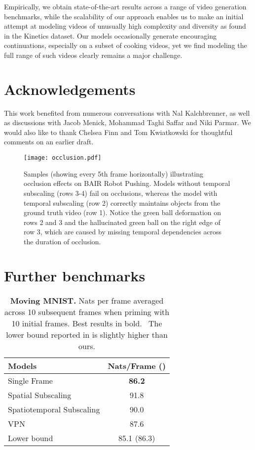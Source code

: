\documentclass{article} \usepackage{iclr2020_conference,times}
\begin{document}
Empirically, we obtain state-of-the-art results across a range of video generation benchmarks, while the scalability of our approach enables us to make an initial attempt at modeling videos of unusually high complexity and diversity as found in the Kinetics dataset. Our models occasionally generate encouraging continuations, especially on a subset of cooking videos, yet we find modeling the full range of such videos clearly remains a major challenge.

\section*{Acknowledgements}
This work benefited from numerous conversations with Nal Kalchbrenner, as well as discussions
with Jacob Menick, Mohammad Taghi Saffar and Niki Parmar. We would also like to thank Chelsea
Finn and Tom Kwiatkowski for thoughtful comments on an earlier draft.





\clearpage


\appendix

\begin{figure}[t]
  \centering
  \texttt{[image: occlusion.pdf]}
  \caption{Samples (showing every 5th frame horizontally) illustrating occlusion effects on BAIR Robot Pushing. Models without temporal subscaling (rows 3-4) fail on occlusions, whereas the model with temporal subscaling (row 2) correctly maintains objects from the ground truth video (row 1). Notice the green ball deformation on rows 2 and 3 and the hallucinated green ball on the right edge of row 3, which are caused by missing temporal dependencies across the duration of occlusion.}
  \label{fig:occlusion}
\end{figure}

\section{Further benchmarks}\label{sec:other_benchmarks}

\begin{table}[t]
    \centering
    \caption{\textbf{Moving MNIST.} Nats per frame averaged across 10 subsequent frames when priming with 10 initial frames. Best results in bold. ~The lower bound reported in \citep{Kalchbrenner2016VideoPN} is slightly higher than ours.}\label{tab:mnist}
    \begin{tabular}{l c}
        \toprule
\textbf{Models} & Nats/Frame () \\ \midrule
        Single Frame & \textbf{86.2} \\
        Spatial Subscaling & 91.8 \\
        Spatiotemporal Subscaling & 90.0 \\
        \midrule
        VPN \citep{Kalchbrenner2016VideoPN} & 87.6 \\
        Lower bound  & 85.1 (86.3) \\
        \bottomrule
    \end{tabular}
\end{table}
\end{document}
